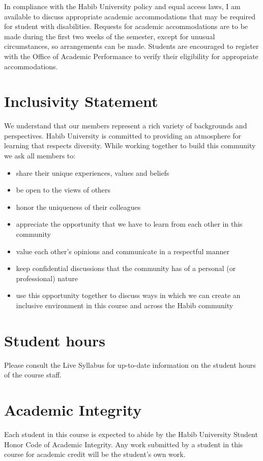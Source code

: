 \documentclass[a4paper]{article}
\begin{document}
In compliance with the Habib University policy and equal access laws, I am available to discuss appropriate academic accommodations that may be required for student with disabilities. Requests for academic accommodations are to be made during the first two weeks of the semester, except for unusual circumstances, so arrangements can be made. Students are encouraged to register with the Office of Academic Performance to verify their eligibility for appropriate accommodations.

\section{Inclusivity Statement}


We understand that our members represent a rich variety of backgrounds and perspectives. Habib University is committed to providing an atmosphere for learning that respects diversity. While working together to build this community we ask all members to:
\begin{itemize}
\item share their unique experiences, values and beliefs
\item be open to the views of others 
\item honor the uniqueness of their colleagues
\item appreciate the opportunity that we have to learn from each other in this community
\item value each other’s opinions and communicate in a respectful manner
\item keep confidential discussions that the community has of a personal (or professional) nature 
\item use this opportunity together to discuss ways in which we can create an inclusive environment in this course and across the Habib community 
\end{itemize}

\section{Student hours}

Please consult the Live Syllabus for up-to-date information on the student hours of the course staff. 

\section{Academic Integrity}

Each student in this course is expected to abide by the Habib University Student Honor Code of Academic Integrity. Any work submitted by a student in this course for academic credit will be the student's own work. 
\end{document}
